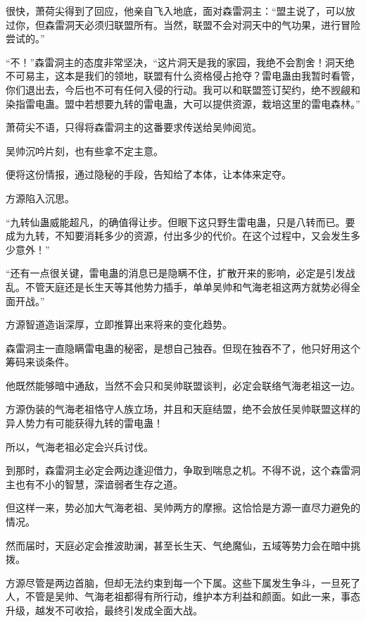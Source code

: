 
\begin{this_body}

很快，萧荷尖得到了回应，他亲自飞入地底，面对森雷洞主：“盟主说了，可以放过你，但森雷洞天必须归联盟所有。当然，联盟不会对洞天中的气功果，进行冒险尝试的。”

“不！”森雷洞主的态度非常坚决，“这片洞天是我的家园，我绝不会割舍！洞天绝不可易主，这本是我们的领地，联盟有什么资格侵占抢夺？雷电蛊由我暂时看管，你们退出去，今后也不可有任何入侵的行动。我可以和联盟签订契约，绝不觊觎和染指雷电蛊。盟中若想要九转的雷电蛊，大可以提供资源，栽培这里的雷电森林。”

萧荷尖不语，只得将森雷洞主的这番要求传送给吴帅阅览。

吴帅沉吟片刻，也有些拿不定主意。

便将这份情报，通过隐秘的手段，告知给了本体，让本体来定夺。

方源陷入沉思。

“九转仙蛊威能超凡，的确值得让步。但眼下这只野生雷电蛊，只是八转而已。要成为九转，不知要消耗多少的资源，付出多少的代价。在这个过程中，又会发生多少意外！”

“还有一点很关键，雷电蛊的消息已是隐瞒不住，扩散开来的影响，必定是引发战乱。不管天庭还是长生天等其他势力插手，单单吴帅和气海老祖这两方就势必得全面开战。”

方源智道造诣深厚，立即推算出来将来的变化趋势。

森雷洞主一直隐瞒雷电蛊的秘密，是想自己独吞。但现在独吞不了，他只好用这个筹码来谈条件。

他既然能够暗中通敌，当然不会只和吴帅联盟谈判，必定会联络气海老祖这一边。

方源伪装的气海老祖恪守人族立场，并且和天庭结盟，绝不会放任吴帅联盟这样的异人势力有可能获得九转的雷电蛊！

所以，气海老祖必定会兴兵讨伐。

到那时，森雷洞主必定会两边逢迎借力，争取到喘息之机。不得不说，这个森雷洞主也有不小的智慧，深谙弱者生存之道。

但这样一来，势必加大气海老祖、吴帅两方的摩擦。这恰恰是方源一直尽力避免的情况。

然而届时，天庭必定会推波助澜，甚至长生天、气绝魔仙，五域等势力会在暗中挑拨。

方源尽管是两边首脑，但却无法约束到每一个下属。这些下属发生争斗，一旦死了人，不管是吴帅、气海老祖都得有所行动，维护本方利益和颜面。如此一来，事态升级，越发不可收拾，最终引发成全面大战。


\end{this_body}
